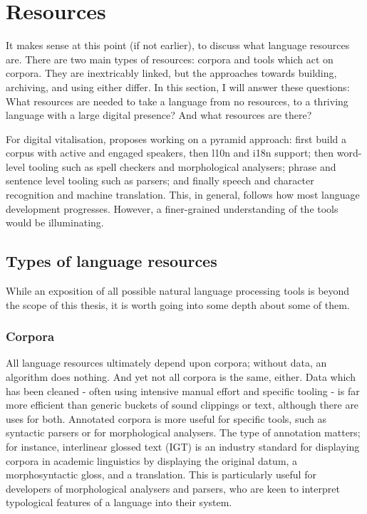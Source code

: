 \section{Resources}
\label{sec:resources}

It makes sense at this point (if not earlier), to discuss what language resources are. There are two main types of resources: corpora and tools which act on corpora. They are inextricably linked, but the approaches towards building, archiving, and using either differ. In this section, I will answer these questions: What resources are needed to take a language from no resources, to a thriving language with a large digital presence? And what resources are there?

For digital vitalisation, \citet{kornai2015new} proposes working on a pyramid approach: first build a corpus with active and engaged speakers, then l10n and i18n support; then word-level tooling such as spell checkers and morphological analysers; phrase and sentence level tooling such as parsers; and finally speech and character recognition and machine translation. This, in general, follows how most language development progresses. However, a finer-grained understanding of the tools would be illuminating.

\subsection{Types of language resources}

While an exposition of all possible natural language processing tools is beyond the scope of this thesis, it is worth going into some depth about some of them.

\subsubsection{Corpora}

All language resources ultimately depend upon corpora; without data, an algorithm does nothing. And yet not all corpora is the same, either. Data which has been cleaned - often using intensive manual effort and specific tooling - is far more efficient than generic buckets of sound clippings or text, although there are uses for both. Annotated corpora is more useful for specific tools, such as syntactic parsers or for morphological analysers. The type of annotation matters; for instance, interlinear glossed text (IGT) is an industry standard for displaying corpora in academic linguistics by displaying the original datum, a morphosyntactic gloss, and a translation. This is particularly useful for developers of morphological analysers and parsers, who are keen to interpret typological features of a language into their system.

